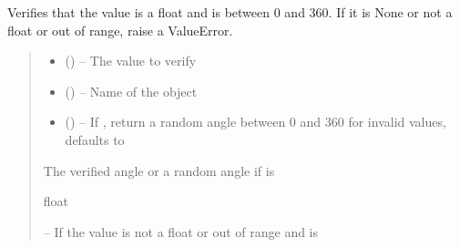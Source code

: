 \documentclass[letterpaper,10pt,english]{sphinxmanual}
\begin{document}
\begin{fulllineitems}
\label{\detokenize{fspsim.utils:fspsim.utils.SpaceObject.verify_angle}}
\pysigstartsignatures
{}
\pysigstopsignatures
\sphinxAtStartPar
Verifies that the value is a float and is between 0 and 360. If it is None or not
a float or out of range, raise a ValueError.
\begin{quote}\begin{description}
\begin{itemize}
\item {} 
\sphinxAtStartPar
{} () – The value to verify

\item {} 
\sphinxAtStartPar
{} () – Name of the object

\item {} 
\sphinxAtStartPar
{} (\sphinxstyleliteralemphasis{\sphinxupquote{, }}) – If , return a random angle between 0 and 360 for invalid values, defaults to 

\end{itemize}

\sphinxAtStartPar
The verified angle or a random angle if  is 

\sphinxAtStartPar
float

\sphinxAtStartPar
{} – If the value is not a float or out of range and  is 

\end{description}\end{quote}

\end{fulllineitems}
\end{document}
